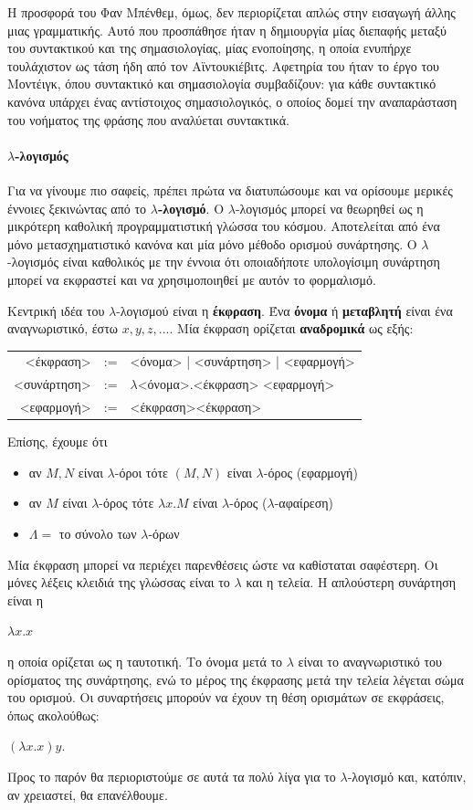 \documentclass [a4paper,11pt] {book}
\theoremstyle{definition}
\theoremstyle{definition}
\begin{document}
Η προσφορά του Φαν Μπένθεμ, όμως, δεν περιορίζεται απλώς στην εισαγωγή άλλης μιας γραμματικής. Αυτό που προσπάθησε ήταν η δημιουργία μίας διεπαφής μεταξύ του συντακτικού και της σημασιολογίας, μίας ενοποίησης, η οποία ενυπήρχε τουλάχιστον ως τάση ήδη από τον Αϊντουκιέβιτς. Αφετηρία του ήταν το έργο του Μοντέιγκ, όπου συντακτικό και σημασιολογία συμβαδίζουν: για κάθε συντακτικό κανόνα υπάρχει ένας αντίστοιχος σημασιολογικός, ο οποίος δομεί την αναπαράσταση του νοήματος της φράσης που αναλύεται συντακτικά.


\paragraph{$\lambda$-λογισμός}
\label{lambdaCalculus}
Για να γίνουμε πιο σαφείς, πρέπει πρώτα να διατυπώσουμε και να ορίσουμε μερικές έννοιες ξεκινώντας από το \textbf{$\lambda$-λογισμό}. Ο $\lambda$-λογισμός μπορεί να θεωρηθεί ως η μικρότερη καθολική προγραμματιστική γλώσσα του κόσμου. Αποτελείται από ένα μόνο μετασχηματιστικό κανόνα και μία μόνο μέθοδο ορισμού συνάρτησης. Ο $\lambda$-λογισμός είναι καθολικός με την έννοια ότι οποιαδήποτε υπολογίσιμη συνάρτηση μπορεί να εκφραστεί και να χρησιμοποιηθεί με αυτόν το φορμαλισμό.

Κεντρική ιδέα του $\lambda$-λογισμού είναι η \textbf{έκφραση}. Ένα \textbf{όνομα} ή \textbf{μεταβλητή} είναι ένα αναγνωριστικό, έστω $x,y,z,...$. Μία έκφραση ορίζεται \textbf{αναδρομικά} ως εξής:
\begin{center}
\begin{tabular}{rcl}
<έκφραση> & := & <όνομα> | <συνάρτηση> | <εφαρμογή>\\
<συνάρτηση> & := & $\lambda$<όνομα>.<έκφραση>
<εφαρμογή>\\
<εφαρμογή> & := & <έκφραση><έκφραση>
\end{tabular}
\end{center}
Επίσης, έχουμε ότι
\begin{itemize}
\item αν $M,N$ είναι $\lambda$-όροι τότε $(M,N)$ είναι $\lambda$-όρος (εφαρμογή)
\item αν $M$ είναι $\lambda$-όρος τότε $\lambda x.M$ είναι $\lambda$-όρος ($\lambda$-αφαίρεση)
\item $\Lambda =$ το σύνολο των $\lambda$-όρων
\end{itemize}
Μία έκφραση μπορεί να περιέχει παρενθέσεις ώστε να καθίσταται σαφέστερη. Οι μόνες λέξεις κλειδιά της γλώσσας είναι το $\lambda$ και η τελεία. Η απλούστερη συνάρτηση είναι η 
\begin{center}
$\lambda x.x$
\end{center}
η οποία ορίζεται ως η ταυτοτική. Το όνομα μετά το $\lambda$ είναι το αναγνωριστικό του ορίσματος της συνάρτησης, ενώ το μέρος της έκφρασης μετά την τελεία λέγεται σώμα του ορισμού. Οι συναρτήσεις μπορούν να έχουν τη θέση ορισμάτων σε εκφράσεις, όπως ακολούθως:
\begin{center}
$(\lambda x.x)y$.
\end{center}
Προς το παρόν θα περιοριστούμε σε αυτά τα πολύ λίγα για το $\lambda$-λογισμό και, κατόπιν, αν χρειαστεί, θα επανέλθουμε.
\end{document}

